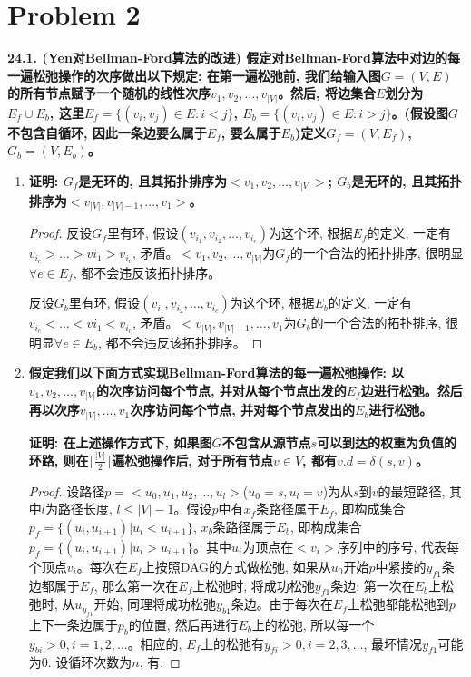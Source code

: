 \documentclass[paper=a4, fontsize=11pt]{scrartcl} %
\numberwithin{equation}{section} %
\numberwithin{figure}{section} %
\numberwithin{table}{section} %
\begin{document}
\section{Problem 2}
\textbf{24.1. (Yen对Bellman-Ford算法的改进) 假定对Bellman-Ford算法中对边的每一遍松弛操作的次序做出以下规定: 在第一遍松弛前, 我们给输入图$G = (V, E)$的所有节点赋予一个随机的线性次序$v_1, v_2, \dots, v_{|V|}$。然后, 将边集合$E$划分为$E_f \cup E_b$, 这里$E_f = \{ (v_i, v_j) \in E: i < j\}$, $E_b = \{ (v_i, v_j) \in E: i > j\}$。(假设图$G$不包含自循环, 因此一条边要么属于$E_f$, 要么属于$E_b$)定义$G_f = (V, E_f)$, $G_b = (V, E_b)$。}
\begin{enumerate}[a]
\item \textbf{证明: $G_f$是无环的, 且其拓扑排序为$< v_1, v_2, \dots, v_{|V|}>$; $G_b$是无环的, 且其拓扑排序为$<v_{|V|}, v_{|V| - 1}, \dots, v_1>$。}

  \begin{proof}
    反设$G_f$里有环, 假设$(v_{i_1}, v_{i_2}, \dots, v_{i_c})$为这个环, 根据$E_f$的定义, 一定有$v_{i_c} > \dots > v{i_1} > v_{i_c}$, 矛盾。$<v_1, v_2, \dots, v_{|V|}$为$G_f$的一个合法的拓扑排序, 很明显$\forall e \in E_f$, 都不会违反该拓扑排序。

    反设$G_b$里有环, 假设$(v_{i_1}, v_{i_2}, \dots, v_{i_c})$为这个环, 根据$E_b$的定义, 一定有$v_{i_c} < \dots < v{i_1} < v_{i_c}$, 矛盾。$<v_{|V|}, v_{|V| - 1}, \dots, v_1$为$G_b$的一个合法的拓扑排序, 很明显$\forall e \in E_b$, 都不会违反该拓扑排序。
  \end{proof}

\item \textbf{假定我们以下面方式实现Bellman-Ford算法的每一遍松弛操作: 以$v_1, v_2, \dots, v_{|V|}$的次序访问每个节点, 并对从每个节点出发的$E_f$边进行松弛。然后再以次序$v_{|V|}, \dots, v_1$次序访问每个节点, 并对每个节点发出的$E_b$进行松弛。}

  \textbf{证明: 在上述操作方式下, 如果图$G$不包含从源节点$s$可以到达的权重为负值的环路, 则在$\lceil \frac{|V|}{2} \rceil$遍松弛操作后, 对于所有节点$v \in V$, 都有$v.d = \delta(s, v)$。}

  \begin{proof}
    设路径$p = <u_0, u_1, u_2, \dots, u_l>$($u_0 = s, u_l = v$)为从$s$到$v$的最短路径, 其中$l$为路径长度, $l \leq |V| - 1$。假设$p$中有$x_f$条路径属于$E_f$, 即构成集合$p_f = \{(u_i, u_{i+1}) | u_i < u_{i+1}\}$, $x_b$条路径属于$E_b$, 即构成集合$p_f = \{(u_i, u_{i+1}) | u_i > u_{i+1}\}$。其中$u_i$为顶点在$<v_i>$序列中的序号, 代表每个顶点$v_i$。每次在$E_f$上按照DAG的方式做松弛, 如果从$u_0$开始$p$中紧接的$y_{f1}$条边都属于$E_f$, 那么第一次在$E_f$上松弛时, 将成功松弛$y_{f1}$条边; 第一次在$E_b$上松弛时, 从$u_{y_{f1}}$开始, 同理将成功松弛$y_{b1}$条边。由于每次在$E_f$上松弛都能松弛到$p$上下一条边属于$p_b$的位置, 然后再进行$E_b$上的松弛, 所以每一个$y_{bi} > 0, i=1,2,\dots$。相应的, $E_f$上的松弛有$y_{fi} > 0, i=2,3,\dots$, 最坏情况$y_{f1}$可能为0. 设循环次数为$n$, 有:


\end{proof}
\end{enumerate}
\end{document}
